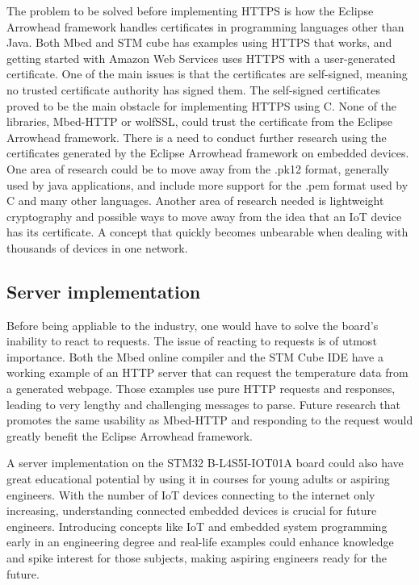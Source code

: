 The problem to be solved before implementing HTTPS is how the Eclipse Arrowhead framework handles certificates in programming languages other than Java.
Both Mbed and STM cube has examples using HTTPS that works, and getting started with Amazon Web Services uses HTTPS with a user-generated certificate.
One of the main issues is that the certificates are self-signed, meaning no trusted certificate authority has signed them. 
The self-signed certificates proved to be the main obstacle for implementing HTTPS using C. None of the libraries, Mbed-HTTP or wolfSSL, could trust the certificate from the Eclipse Arrowhead framework.
There is a need to conduct further research using the certificates generated by the Eclipse Arrowhead framework on embedded devices.
One area of research could be to move away from the .pk12 format, generally used by java applications, and include more support for the .pem format used by C and many other languages.
Another area of research needed is lightweight cryptography and possible ways to move away from the idea that an IoT device has its certificate.
A concept that quickly becomes unbearable when dealing with thousands of devices in one network.

\subsection{Server implementation}
Before being appliable to the industry, one would have to solve the board's inability to react to requests. 
The issue of reacting to requests is of utmost importance. 
Both the Mbed online compiler and the STM Cube IDE have a working example of an HTTP server that can request the temperature data from a generated webpage.
Those examples use pure HTTP requests and responses, leading to very lengthy and challenging messages to parse. 
Future research that promotes the same usability as Mbed-HTTP and responding to the request would greatly benefit the Eclipse Arrowhead framework.  

A server implementation on the STM32 B-L4S5I-IOT01A board could also have great educational potential by using it in courses for young adults or aspiring engineers.
With the number of IoT devices connecting to the internet only increasing, understanding connected embedded devices is crucial for future engineers. 
Introducing concepts like IoT and embedded system programming early in an engineering degree and real-life examples could enhance knowledge and spike interest for those subjects, making aspiring engineers ready for the future.
